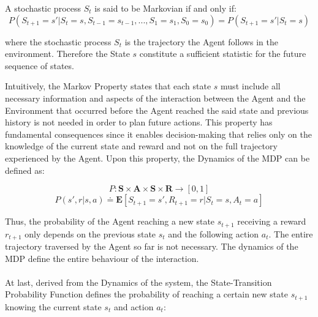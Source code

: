             \begin{definition}
                \label{def:markov}
                A stochastic process $S_{t}$ is said to be Markovian if and only if:
                \[ P \left( S_{t+1} = s' | S_{t} = s, S_{t-1} = s_{t-1}, ..., S_{1} = s_1, S_{0} = s_0 \right) = P \left( S_{t+1} = s' | S_{t} = s \right)\]
                
                where the stochastic process $S_t$ is the trajectory the Agent follows in the environment. Therefore the State $s$ constitute a sufficient statistic for the future sequence of states.
            \end{definition}
            \noindent
            Intuitively, the Markov Property states that each state $s$ must include all necessary information and aspects of the interaction between the Agent and the Environment that occurred before the Agent reached the said state and previous history is not needed in order to plan future actions. \newline
            This property has fundamental consequences since it enables decision-making that relies only on the knowledge of the current state and reward and not on the full trajectory experienced by the Agent. Upon this property, the Dynamics of the MDP can be defined as: 
            
            \begin{definition}
                \label{def:dynamics}
                \[P : \mathbf{S} \times \mathbf{A} \times \mathbf{S} \times \mathbf{R} \rightarrow [0, 1] \]
                \[P(s', r | s, a) \doteq \mathbf{E} \left[S_{t+1}=s', R_{t+1}=r | S_t=s, A_t=a \right]\]
            \end{definition}
            \noindent
            Thus, the probability of the Agent reaching a new state $s_{t+1}$ receiving a reward $r_{t+1}$ only depends on the previous state $s_t$ and the following action $a_t$. The entire trajectory traversed by the Agent so far is not necessary. The dynamics of the MDP define the entire behaviour of the interaction.
            \\\\
            At last, derived from the Dynamics of the system, the State-Transition Probability Function defines the probability of reaching a certain new state $s_{t+1}$ knowing the current state $s_t$ and action $a_t$:
            
